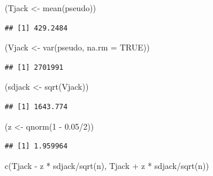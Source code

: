 \documentclass[
  12pt,
]{book}
\newenvironment{Shaded}{\begin{snugshade}}{\end{snugshade}}
\newcommand{\AttributeTok}[1]{\textcolor[rgb]{0.77,0.63,0.00}{#1}}
\newcommand{\ConstantTok}[1]{\textcolor[rgb]{0.00,0.00,0.00}{#1}}
\newcommand{\DecValTok}[1]{\textcolor[rgb]{0.00,0.00,0.81}{#1}}
\newcommand{\FloatTok}[1]{\textcolor[rgb]{0.00,0.00,0.81}{#1}}
\newcommand{\FunctionTok}[1]{\textcolor[rgb]{0.00,0.00,0.00}{#1}}
\newcommand{\NormalTok}[1]{#1}
\newcommand{\OtherTok}[1]{\textcolor[rgb]{0.56,0.35,0.01}{#1}}
\newcommand{\SpecialCharTok}[1]{\textcolor[rgb]{0.00,0.00,0.00}{#1}}
\theoremstyle{definition}
\theoremstyle{definition}
\theoremstyle{definition}
\theoremstyle{definition}
\theoremstyle{remark}
\begin{document}
\begin{Shaded}
\begin{Highlighting}[]
\NormalTok{(Tjack }\OtherTok{\textless{}{-}} \FunctionTok{mean}\NormalTok{(pseudo))}
\end{Highlighting}
\end{Shaded}

\begin{verbatim}
## [1] 429.2484
\end{verbatim}

\begin{Shaded}
\begin{Highlighting}[]
\NormalTok{(Vjack }\OtherTok{\textless{}{-}} \FunctionTok{var}\NormalTok{(pseudo, }\AttributeTok{na.rm =} \ConstantTok{TRUE}\NormalTok{))}
\end{Highlighting}
\end{Shaded}

\begin{verbatim}
## [1] 2701991
\end{verbatim}

\begin{Shaded}
\begin{Highlighting}[]
\NormalTok{(sdjack }\OtherTok{\textless{}{-}} \FunctionTok{sqrt}\NormalTok{(Vjack))}
\end{Highlighting}
\end{Shaded}

\begin{verbatim}
## [1] 1643.774
\end{verbatim}

\begin{Shaded}
\begin{Highlighting}[]
\NormalTok{(z }\OtherTok{\textless{}{-}} \FunctionTok{qnorm}\NormalTok{(}\DecValTok{1} \SpecialCharTok{{-}} \FloatTok{0.05}\SpecialCharTok{/}\DecValTok{2}\NormalTok{))}
\end{Highlighting}
\end{Shaded}

\begin{verbatim}
## [1] 1.959964
\end{verbatim}

\begin{Shaded}
\begin{Highlighting}[]
\FunctionTok{c}\NormalTok{(Tjack }\SpecialCharTok{{-}}\NormalTok{ z }\SpecialCharTok{*}\NormalTok{ sdjack}\SpecialCharTok{/}\FunctionTok{sqrt}\NormalTok{(n), Tjack }\SpecialCharTok{+}\NormalTok{ z }\SpecialCharTok{*}\NormalTok{ sdjack}\SpecialCharTok{/}\FunctionTok{sqrt}\NormalTok{(n))}
\end{Highlighting}
\end{Shaded}
\end{document}
